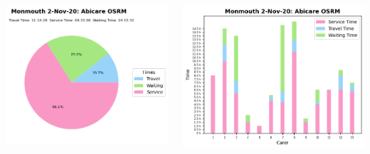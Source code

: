 \documentclass[usenames,dvipsnames]{beamer}
\begin{document}
\begin{frame} %
	\begin{columns}
		\begin{minipage}[c][0.45\textheight][c]{\linewidth}
			\centering
			\includegraphics[width=1\linewidth]{figures/2_Nov_20_Monmouth_time_info_abiosrm}
		\end{minipage}
		\begin{minipage}[c][0.45\textheight][c]{\linewidth}
			\vspace{5mm}
			\centering
			\includegraphics[width=1\linewidth]{figures/2_Nov_20_Monmouth_workload_abiosrm}

\end{minipage}
\end{columns}
\end{frame}
\end{document}
